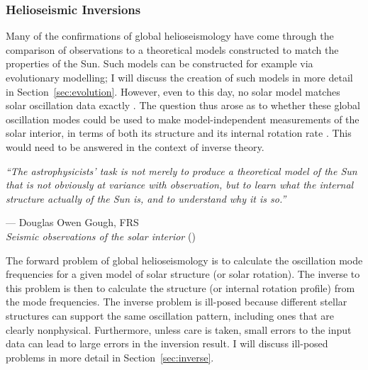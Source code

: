 \subsubsection*{Helioseismic Inversions}
Many of the confirmations of global helioseismology have come through the comparison of observations to a theoretical models constructed to match the properties of the Sun. %
Such models can be constructed for example via evolutionary modelling; I will discuss the creation of such models in more detail in Section~\ref{sec:evolution}. 
However, even to this day, no solar model matches solar oscillation data exactly \citep[e.g.,][]{1980Natur.288..544C}. 
The question thus arose as to whether these global oscillation modes could be used to make model-independent measurements of the solar interior, in terms of both its structure and its internal rotation rate \citep[e.g.,][]{1976Natur.259...89C, 1981MNRAS.196..731G}. 
This would need to be answered in the context of inverse theory. 

\epigraph{\emph{``The astrophysicists' task is not merely to produce a theoretical model of the Sun \hphantom{``}that is not obviously at variance with observation, but to learn what the internal \hphantom{``}structure actually of the Sun is, and to understand why it is so.''
}}{--- Douglas Owen Gough, FRS \\ 
\textit{Seismic observations of the solar interior} (\citeyear{1991ARA&A..29..627G})}

The forward problem of global helioseismology is to calculate the oscillation mode frequencies for a given model of solar structure (or solar rotation). 
The inverse to this problem is then to calculate the structure (or internal rotation profile) from the mode frequencies. 
The inverse problem is ill-posed because different stellar structures can support the same oscillation pattern, including ones that are clearly nonphysical. 
Furthermore, unless care is taken, small errors to the input data can lead to large errors in the inversion result. 
I will discuss ill-posed problems in more detail in Section~\ref{sec:inverse}. 

